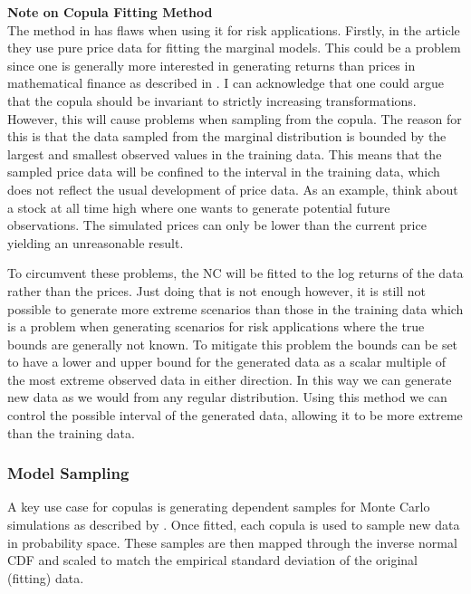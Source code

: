 \begin{remark}
    \textbf{Note on Copula Fitting Method}\\
    The method in  has flaws when using it for risk applications. Firstly, in the article they use pure price data for fitting the marginal models. This could be a problem since one is generally more interested in generating returns than prices in mathematical finance as described in . I can acknowledge that one could argue that the copula should be invariant to strictly increasing transformations. However, this will cause problems when sampling from the copula. The reason for this is that the data sampled from the marginal distribution is bounded by the largest and smallest observed values in the training data. This means that the sampled price data will be confined to the interval in the training data, which does not reflect the usual development of price data. As an example, think about a stock at all time high where one wants to generate potential future observations. The simulated prices can only be lower than the current price yielding an unreasonable result. 
    
    To circumvent these problems, the \gls{NC} will be fitted to the log returns of the data rather than the prices. Just doing that is not enough however, it is still not possible to generate more extreme scenarios than those in the training data which is a problem when generating scenarios for risk applications where the true bounds are generally not known. To mitigate this problem the bounds can be set to have a lower and upper bound for the generated data as a scalar multiple of the most extreme observed data in either direction. In this way we can generate new data as we would from any regular distribution. Using this method we can control the possible interval of the generated data, allowing it to be more extreme than the training data. 
\end{remark}


\subsubsection{Model Sampling}
A key use case for copulas is generating dependent samples for Monte Carlo simulations as described by \citet[p.~40]{Nelsen2006}. Once fitted, each copula is used to sample new data in probability space. These samples are then mapped through the inverse normal CDF and scaled to match the empirical standard deviation of the original (fitting) data.

